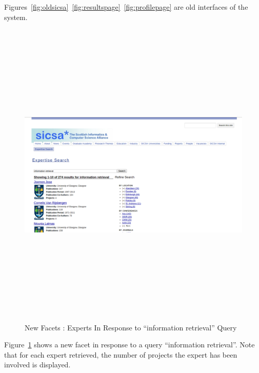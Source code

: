 Figures~\ref{fig:oldsicsa}~\ref{fig:resultspage}~\ref{fig:profilepage} are old interfaces of the system. 

\begin{figure}
\centering
\includegraphics[width=13cm,height=15cm,keepaspectratio]{./figures/newsearch.png}
\caption{New Facets : Experts In Response to ``information retrieval'' Query} \label{fig:newsearch} 
\end{figure}
Figure~\ref{fig:newsearch} shows a new facet in response to a query ``information retrieval''. Note that for each expert retrieved, the number of 
projects the expert has been involved is displayed.
